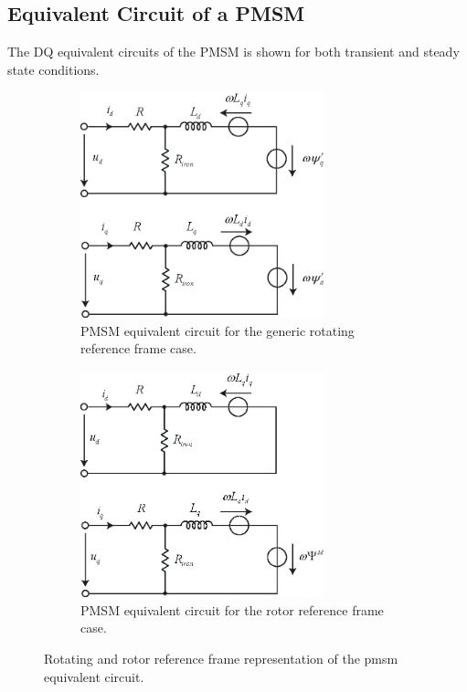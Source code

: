 \documentclass[11pt,a4paper,oneside]{book}
\numberwithin{equation}{section}
\theoremstyle{it}
\theoremstyle{definition}
\begin{document}
\subsection{Equivalent Circuit of a PMSM}
The DQ equivalent circuits of the PMSM is shown for both transient and 
steady state conditions.
\begin{figure}[H]
	\centering
	\begin{subfigure}{.5\textwidth}
		\centering
		\includegraphics[width = 200pt, 
		keepaspectratio]{figures/pmsm/pmsm_electrical_equivalent_1.eps}
		\captionsetup{width=0.5\textwidth, font=small}		
		\caption{PMSM equivalent circuit for the generic rotating reference 
			frame case.}
		\label{}
	\end{subfigure}%
	\begin{subfigure}{.5\textwidth}
		\centering
		\includegraphics[width = 200pt, 
		keepaspectratio]{figures/pmsm/pmsm_electrical_equivalent_2.eps}
		\captionsetup{width=0.5\textwidth, font=small}		
		\caption{PMSM equivalent circuit for the rotor reference frame 
			case.}
		\label{}
	\end{subfigure}
	\captionsetup{width=0.5\textwidth, font=small}		
	\caption{Rotating and rotor reference frame representation of the pmsm 
		equivalent circuit.}
	\label{pmsm_equivalent_circuit}
\end{figure}
\end{document}
